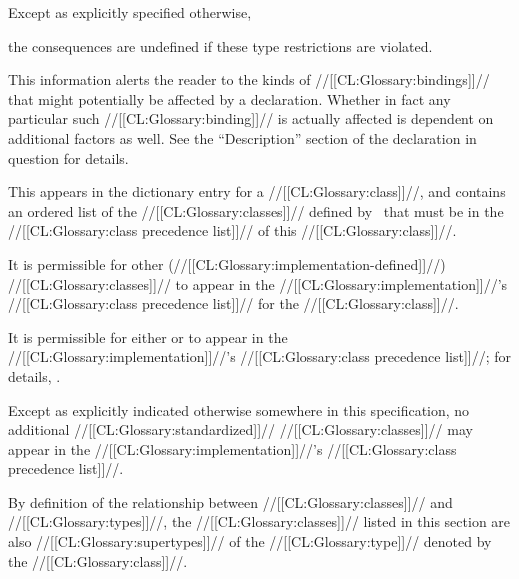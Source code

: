 Except as explicitly specified otherwise,

the consequences are undefined if these type restrictions are violated.

\endsubsubsection%


This information alerts the reader to the kinds of //[[CL:Glossary:bindings]]// that might 
potentially be affected by a declaration.  Whether in fact any particular such
//[[CL:Glossary:binding]]// is actually affected is dependent on additional factors as well.
See the ``Description'' section of the declaration in question for details.

\endsubsubsection%


This appears in the dictionary entry for a //[[CL:Glossary:class]]//,
and contains an ordered list of the //[[CL:Glossary:classes]]// defined 
by \clisp\ that must be in the //[[CL:Glossary:class precedence list]]// of this //[[CL:Glossary:class]]//.

It is permissible for other (//[[CL:Glossary:implementation-defined]]//) //[[CL:Glossary:classes]]//
to appear in the //[[CL:Glossary:implementation]]//'s //[[CL:Glossary:class precedence list]]// for the //[[CL:Glossary:class]]//.

It is permissible for 
  either 
      or 
to appear in the //[[CL:Glossary:implementation]]//'s //[[CL:Glossary:class precedence list]]//;
for details, \seesection\TypeRelationships.

Except as explicitly indicated otherwise somewhere in this specification,
no additional //[[CL:Glossary:standardized]]// //[[CL:Glossary:classes]]// may appear in 
the //[[CL:Glossary:implementation]]//'s //[[CL:Glossary:class precedence list]]//.

By definition of the relationship between //[[CL:Glossary:classes]]// and //[[CL:Glossary:types]]//,
the //[[CL:Glossary:classes]]// listed in this section are also //[[CL:Glossary:supertypes]]// of 
the //[[CL:Glossary:type]]// denoted by the //[[CL:Glossary:class]]//.

\endsubsubsection%

